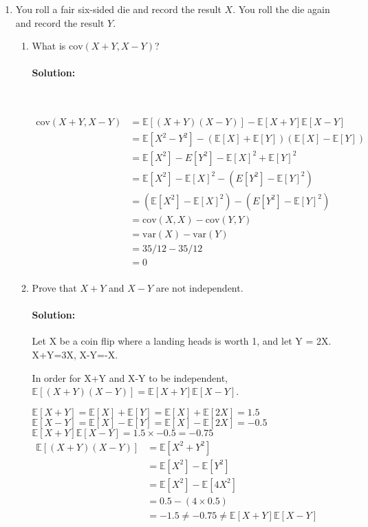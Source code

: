\documentclass[11pt, notitlepage]{article}
\newcommand{\E}{\mathbb{E}}
\newcommand{\var}{\text{var}}
\newcommand{\cov}{\text{cov}}
\newenvironment{solution}{\paragraph{Solution:}}{\hfill \vspace{10mm}}
\begin{document}
\begin{enumerate}[label=\alph*.)]
	\item You roll a fair six-sided die and record the result $X$. You roll the die again and record the result $Y$. 
	
	\begin{enumerate}[label=(\roman*)]
		\item What is $\cov (X+Y, X-Y)$? 
		\begin{solution}\
		
		$\begin{aligned}
			\cov (X+Y, X-Y)&=\E[(X+Y)(X-Y)]-\E[X+Y]\E[X-Y]\\
			&= \E[X^2-Y^2]-(\E[X]+\E[Y])(\E[X]-\E[Y]) \\
			&= \E[X^2]-E[Y^2]-\E[X]^2+\E[Y]^2 \\
			&= \E[X^2]-\E[X]^2-(E[Y^2]-\E[Y]^2) \\
			&= (\E[X^2]-\E[X]^2)-(E[Y^2]-\E[Y]^2) \\
			&= \cov (X,X)-\cov (Y, Y) \\
			&= \var(X)-\var(Y) \\
			&= 35/12-35/12 \\
			&= 0 \\
		\end{aligned}$			
%			
%
%		
		\end{solution}
		\item Prove that $X+Y$ and $X-Y$ are not independent.
		\begin{solution}
		Let X be a coin flip where a landing heads is worth 1, and let Y = 2X. X+Y=3X, X-Y=-X.
		
		In order for X+Y and X-Y to be independent, $\E[(X+Y)(X-Y)]=\E[X+Y]\E[X-Y]$.
		
		$\E[X+Y]=\E[X] + \E[Y] = \E[X]+\E[2X]=1.5$ \\
		$\E[X-Y]=\E[X] - \E[Y] = \E[X]-\E[2X]=-0.5$ \\
		$\E[X+Y]\E[X-Y]= 1.5\times -0.5= -0.75$ \\

		$\begin{aligned} \E[(X+Y)(X-Y)]&=\E[X^2+Y^2]\\
		&=\E[X^2] - \E[Y^2] \\
		&= \E[X^2]-\E[4X^2] \\
		&=0.5-(4\times 0.5) \\
		&=-1.5 \not = -0.75 \not = \E[X+Y]\E[X-Y] \end{aligned}$
		

\end{solution}
\end{enumerate}
\end{enumerate}
\end{document}
